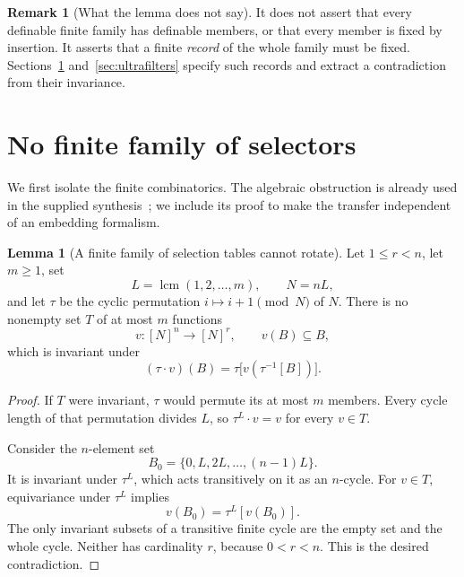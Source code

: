 \documentclass[11pt,letterpaper]{article}
\theoremstyle{definition}
\newtheorem{lemma}[definition]{Lemma}
\newtheorem{remark}[definition]{Remark}
\numberwithin{equation}{section}
\newcommand{\lcm}{\operatorname{lcm}}
\begin{document}
\begin{remark}[What the lemma does not say]
It does not assert that every definable finite family has definable members, or that every member is fixed by insertion. It asserts that a finite \emph{record} of the whole family must be fixed. Sections~\ref{sec:selectors} and~\ref{sec:ultrafilters} specify such records and extract a contradiction from their invariance.
\end{remark}

\section{No finite family of selectors}\label{sec:selectors}

We first isolate the finite combinatorics. The algebraic obstruction is already used in the supplied synthesis~\cite{synthesis}; we include its proof to make the transfer independent of an embedding formalism.

\begin{lemma}[A finite family of selection tables cannot rotate]\label{lem:tables}
Let $1\leq r<n$, let $m\geq1$, set
\[
L=\lcm(1,2,\ldots,m),\qquad N=nL,
\]
and let $\tau$ be the cyclic permutation $i\mapsto i+1\pmod N$ of $N$. There is no nonempty set $T$ of at most $m$ functions
\[
v:[N]^n\longrightarrow[N]^r,\qquad v(B)\subseteq B,
\]
which is invariant under
\[
(\tau\cdot v)(B)=\tau\bigl[v(\tau^{-1}[B])\bigr].
\]
\end{lemma}
\begin{proof}
If $T$ were invariant, $\tau$ would permute its at most $m$ members. Every cycle length of that permutation divides $L$, so $\tau^L\cdot v=v$ for every $v\in T$.

Consider the $n$-element set
\[
B_0=\{0,L,2L,\ldots,(n-1)L\}.
\]
It is invariant under $\tau^L$, which acts transitively on it as an $n$-cycle. For $v\in T$, equivariance under $\tau^L$ implies
\[
v(B_0)=\tau^L[v(B_0)].
\]
The only invariant subsets of a transitive finite cycle are the empty set and the whole cycle. Neither has cardinality $r$, because $0<r<n$. This is the desired contradiction.
\end{proof}
\end{document}
